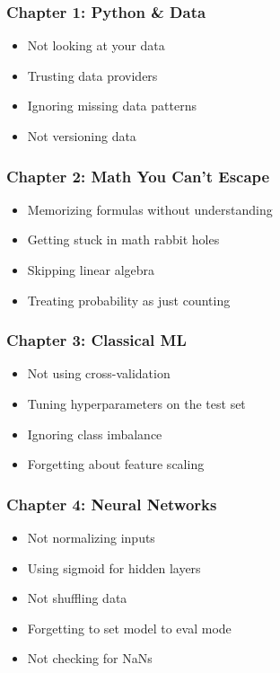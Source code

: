 \documentclass[11pt,oneside]{book}
\begin{document}
\subsubsection*{Chapter 1: Python \& Data}

\begin{itemize}
\item Not looking at your data
\item Trusting data providers
\item Ignoring missing data patterns
\item Not versioning data
\end{itemize}

\subsubsection*{Chapter 2: Math You Can't Escape}

\begin{itemize}
\item Memorizing formulas without understanding
\item Getting stuck in math rabbit holes
\item Skipping linear algebra
\item Treating probability as just counting
\end{itemize}

\subsubsection*{Chapter 3: Classical ML}

\begin{itemize}
\item Not using cross-validation
\item Tuning hyperparameters on the test set
\item Ignoring class imbalance
\item Forgetting about feature scaling
\end{itemize}

\subsubsection*{Chapter 4: Neural Networks}

\begin{itemize}
\item Not normalizing inputs
\item Using sigmoid for hidden layers
\item Not shuffling data
\item Forgetting to set model to eval mode
\item Not checking for NaNs
\end{itemize}
\end{document}
